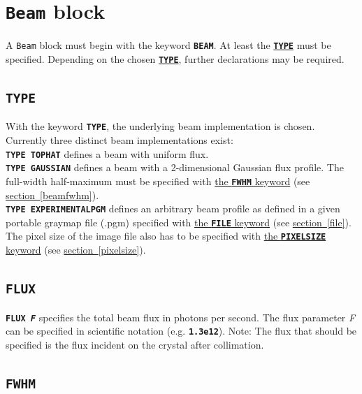\documentclass[a4paper]{article}
\newcommand{\Class}[1]{\texttt{#1}\xspace}
\newcommand{\Keyword}[1]{\texttt{\textbf{#1}}\xspace}
\newcommand{\SB}{\\[0.2em]}
\begin{document}
\label{RDv3End}


\section{\Class{Beam} block}

A \Class{Beam} block must begin with the keyword \Keyword{BEAM}.
At least the \hyperref[beamtype]{\Keyword{TYPE}} must be specified.
Depending on the chosen \hyperref[beamtype]{\Keyword{TYPE}}, further declarations may be required.


\subsection{\Keyword{TYPE}}
\label{beamtype}

With the keyword \Keyword{TYPE}, the underlying beam implementation is chosen.
Currently three distinct beam implementations exist:\SB

\noindent \Keyword{TYPE TOPHAT} defines a beam with uniform flux.\SB

\noindent \Keyword{TYPE GAUSSIAN} defines a beam with a 2-dimensional Gaussian flux profile. The full-width half-maximum must be specified with \hyperref[beamfwhm]{the \Keyword{FWHM} keyword} (see \hyperref[beamfwhm]{section~\ref*{beamfwhm}}).\SB

\noindent \Keyword{TYPE EXPERIMENTALPGM} defines an arbitrary beam profile as defined in a given portable graymap file (.pgm) specified with \hyperref[file]{the \Keyword{FILE} keyword} (see \hyperref[file]{section~\ref*{file}}). The pixel size of the image file also has to be specified with \hyperref[pixelsize]{the \Keyword{PIXELSIZE} keyword} (see \hyperref[pixelsize]{section~\ref*{pixelsize}}).\SB


\subsection{\Keyword{FLUX}}
\label{flux}

\noindent \Keyword{FLUX \textit{F}} specifies the total beam flux in photons per second. The flux parameter \textit{F} can be specified in scientific notation (e.g. \Keyword{1.3e12}). Note: The flux that should be specified is the flux incident on the crystal after collimation.


\subsection{\Keyword{FWHM}}
\end{document}
